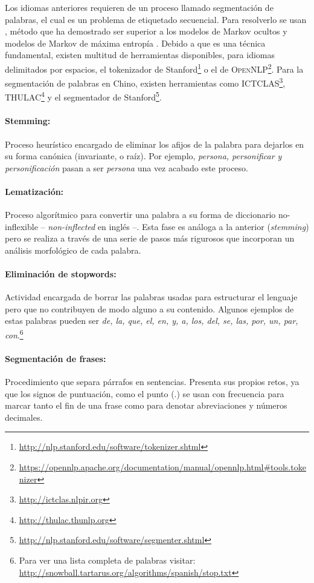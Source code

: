 Los idiomas anteriores requieren de un proceso llamado segmentación de palabras,
el cual es un problema de etiquetado secuencial. Para resolverlo se usan
, método que ha demostrado ser superior a los modelos de
Markov ocultos y modelos de Markov de máxima entropía \cite{Kudo04, tseng2005,
  Peng2004}. Debido a que es una técnica fundamental, existen multitud de
herramientas disponibles, para idiomas delimitados por espacios, el tokenizador
de Stanford\footnote{\url{http://nlp.stanford.edu/software/tokenizer.shtml}} o
el de
\textsc{OpenNLP}\footnote{\url{https://opennlp.apache.org/documentation/manual/opennlp.html\#tools.tokenizer}}.
Para la segmentación de palabras en Chino, existen herramientas como
\textsc{ICTCLAS}\footnote{\url{http://ictclas.nlpir.org}},
\textsc{THULAC}\footnote{\url{http://thulac.thunlp.org}} y el segmentador de
Stanford\footnote{\url{http://nlp.stanford.edu/software/segmenter.shtml}}.

\paragraph{Stemming:}Proceso heurístico encargado de eliminar los afijos de la
palabra para dejarlos en su forma canónica (invariante, o raíz). Por ejemplo,
\emph{persona, personificar y personificación} pasan a ser \emph{persona} una
vez acabado este proceso.

\paragraph{Lematización:}Proceso algorítmico para convertir una palabra a su
forma de diccionario no-inflexible -- \emph{non-inflected} en inglés --. Esta
fase es análoga a la anterior (\emph{stemming}) pero se realiza a través de una
serie de pasos más rigurosos que incorporan un análisis morfológico de cada
palabra.

\paragraph{Eliminación de stopwords:} Actividad encargada de borrar las palabras
usadas para estructurar el lenguaje pero que no contribuyen de modo alguno a su
contenido. Algunos ejemplos de estas palabras pueden ser \emph{de, la, que, el,
  en, y, a, los, del, se, las, por, un, par, con}.\footnote{Para ver una lista
  completa de palabras visitar:
  \url{http://snowball.tartarus.org/algorithms/spanish/stop.txt}}

\paragraph{Segmentación de frases:}Procedimiento que separa párrafos en
sentencias. Presenta sus propios retos, ya que los signos de puntuación, como el
punto (.) se usan con frecuencia para marcar tanto el fin de una frase como para
denotar abreviaciones y números decimales.

